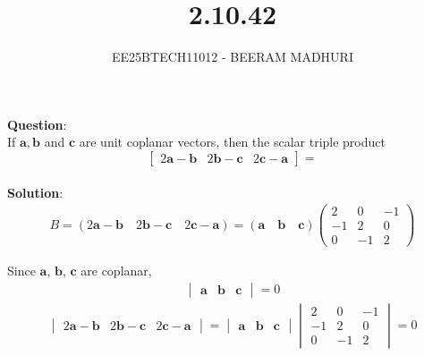 \documentclass[journal]{IEEEtran}
\begin{document}

\vspace{3cm}

\title{2.10.42}
\author{EE25BTECH11012 - BEERAM MADHURI}
\maketitle
{\let\newpage\relax\maketitle}

\renewcommand{\thefigure}{\theenumi}
\renewcommand{\thetable}{\theenumi}
\setlength{\intextsep}{10pt} %


\renewcommand{\thetable}{\theenumi}

\textbf{Question}:\\
If $\mathbf{a}, \mathbf{b}$ and $\mathbf{c}$ are unit coplanar vectors, then the scalar triple product
\[\begin{bmatrix}2\mathbf{a} - \mathbf{b} & 2\mathbf{b} - \mathbf{c} & 2\mathbf{c} - \mathbf{a}\end{bmatrix} =\]\\
\textbf{Solution}:\\
\begin{align}
B = (2\mathbf{a} - \mathbf{b} \quad 2\mathbf{b} - \mathbf{c} \quad 2\mathbf{c} - \mathbf{a}) = (\mathbf{a} \quad \mathbf{b} \quad \mathbf{c})\begin{pmatrix}2 & 0 & -1 \\-1 & 2 & 0 \\0 & -1 & 2\end{pmatrix}
\end{align}

Since $\mathbf{a}$, $\mathbf{b}$, $\mathbf{c}$ are coplanar,
\begin{align}
\begin{vmatrix}\mathbf{a} & \mathbf{b} & \mathbf{c}\end{vmatrix} = 0
\end{align}
\begin{align}
    \begin{vmatrix}2\mathbf{a} - \mathbf{b} & 2\mathbf{b} - \mathbf{c} & 2\mathbf{c} - \mathbf{a}\end{vmatrix} = \begin{vmatrix}\mathbf{a} & \mathbf{b} & \mathbf{c}\end{vmatrix} \begin{vmatrix}2 & 0 & -1 \\-1 & 2 & 0 \\0 & -1 & 2\end{vmatrix} =0
\end{align}
\end{document}

